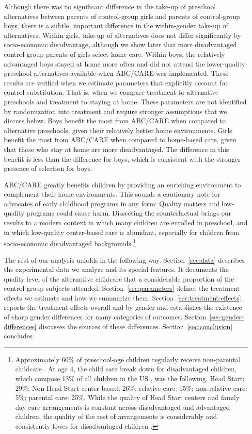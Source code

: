 Although there was no significant difference in the take-up of preschool alternatives between parents of control-group girls and parents of control-group boys, there is a subtle, important difference in the within-gender take-up of alternatives. Within girls, take-up of alternatives does not differ significantly by socio-economic disadvantage, although we show later that more disadvantaged control-group parents of girls select home care. Within boys, the relatively advantaged boys stayed at home more often and did not attend the lower-quality preschool alternatives available when ABC/CARE was implemented. These results are verified when we estimate parameters that explicitly account for control substitution. That is, when we compare treatment to alternative preschools and treatment to staying at home. These parameters are not identified by randomization into treatment and require stronger assumptions that we discuss below. Boys benefit the most from ABC/CARE when compared to alternative preschools, given their relatively better home environments. Girls benefit the most from ABC/CARE when compared to home-based care, given that those who stay at home are more disadvantaged. The difference in this benefit is less than the difference for boys, which is consistent with the stronger presence of selection for boys.

ABC/CARE greatly benefits children by providing an enriching environment to complement their home environments. This sounds a cautionary note for advocates of early childhood programs in any form: Quality matters and low-quality programs could cause harm. Dissecting the counterfactual brings our results to a modern context in which many children are enrolled in preschool, and in which low-quality center-based care is abundant, especially for children from socio-economic disadvantaged backgrounds.\footnote{Approximately 60\% of preschool-age children regularly receive non-parental childcare \citep{FIFCFS_2009_Wellbeing_REPORT}. At age 4, the child care break down for disadvantaged children, which compose 13\% of all children in the US \citep{USCB_2014_CoverageReport}, was the following. Head Start: 29\%; Non-Head Start center-based: 26\%; relative care: 15\%; non-relative care: 5\%; parental care: 25\%. While the quality of Head Start centers and family day care arrangements is constant across disadvantaged and advantaged children, the quality of the rest of arrangements is considerably and consistently lower for disadvantaged children \citep{FIFCFS_2009_Wellbeing_REPORT}.}

The rest of our analysis unfolds in the following way. Section~\ref{sec:data} describes the experimental data we analyze and its special features. It documents the quality level of the alternative childcare that a considerable proportion of the control-group subjects attended. Section~\ref{sec:parameters} defines the treatment effects we estimate and how we summarize them. Section~\ref{sec:treatment-effects} reports the treatment effects overall and by gender and establishes the existence of sharp gender differences for many categories of outcomes. Section~\ref{sec:gender-differences} discusses the sources of these differences. Section~\ref{sec:conclusion} concludes.
